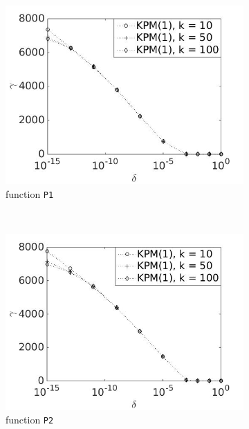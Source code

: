 \begin{figure}[H]
        \centering
        \begin{subfigure}[b]{0.45\textwidth}
                \includegraphics[width=\textwidth]{fig/s20antvstol1k}
                \caption{function \texttt{P1}}
                \label{fig:gammadeltak1}
        \end{subfigure}
~
        \begin{subfigure}[b]{0.45\textwidth}
                \includegraphics[width=\textwidth]{fig/s21antvstol2k}
                \caption{ function \texttt{P2}}
                \label{fig:gammadeltak2}
        \end{subfigure}
                \begin{subfigure}[b]{0.45\textwidth}

\end{subfigure}
\end{figure}
